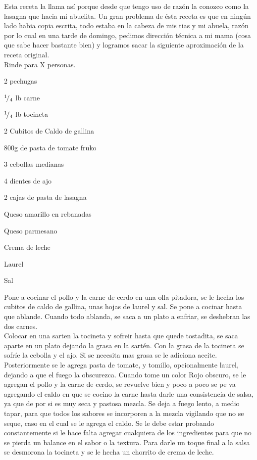 Esta receta la llama así porque desde que tengo uso de razón la conozco como la lasagna que hacia mi abuelita. Un gran problema de ésta receta es que en ningún lado habia copia escrita, todo estaba en la cabeza de mis tias y mi abuela, razón por lo cual en una tarde de domingo, pedimos dirección técnica a mi mama (cosa que sabe hacer bastante bien) y logramos sacar la siguiente aproximación de la receta original. \\

Rinde para X personas.

\begin{ingredientes}
\item 2 pechugas
\item ${}^{1}\!/_{4}$ lb carne
\item ${}^{1}\!/_{4}$ lb tocineta
\item 2 Cubitos de Caldo de gallina
\item 800g de pasta de tomate fruko
\item 3 cebollas medianas
\item 4 dientes de ajo
\item 2 cajas de pasta de lasagna
\item Queso amarillo en rebanadas
\item Queso parmesano
\item Crema de leche
\item Laurel
\item Sal
\end{ingredientes}
\preparacion
Pone a cocinar el pollo y la carne de cerdo en una olla pitadora, se le hecha los cubitos de caldo de gallina, unas hojas de laurel y sal. Se pone a cocinar hasta que ablande. Cuando todo ablanda, se saca a un plato a enfriar, se deshebran las dos carnes.\\

Colocar en una sarten la tocineta y sofreir hasta que quede tostadita, se saca aparte en un plato dejando la grasa en la sartén. Con la grasa de la tocineta se sofríe la cebolla y el ajo. Si se necesita mas grasa se le adiciona aceite. Posteriormente se le agrega pasta de tomate, y tomillo, opcionalmente laurel, dejando a que el fuego la obscurezca. Cuando tome un color Rojo obscuro, se le agregan el pollo y la carne de cerdo, se revuelve bien y poco a poco se pe va agregando el caldo en que se cocino la carne hasta darle una consistencia de salsa, ya que de por si es muy seca y pastosa mezcla. Se deja a fuego lento, a medio tapar, para que todos los sabores se incorporen a la mezcla vigilando que no se seque, caso en el cual se le agrega el caldo. Se le debe estar probando constantemente si le hace falta agregar cualquiera de los ingredientes para que no se pierda un balance en el sabor o la textura. Para darle un toque final a la salsa se desmorona la tocineta y se le hecha un chorrito de crema de leche.\\


